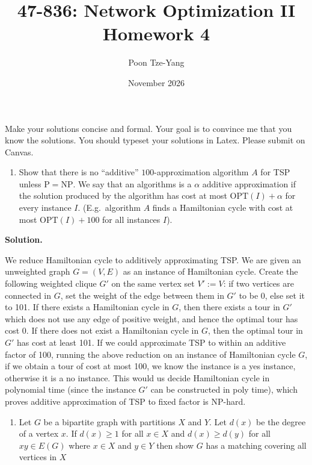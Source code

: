 \documentclass[11pt,letterpaper]{article}
\title{47-836: Network Optimization II \\ Homework 4}
\author{Poon Tze-Yang}
\date{November 2026}
\theoremstyle{definition}
\newcommand{\OPT}{\mathrm{OPT}}
\newcommand{\solution}{\medskip\noindent\textbf{Solution.}\par\medskip}
\begin{document}
\maketitle

Make your solutions concise and formal. Your goal is to convince me that you know the solutions. You should typeset your solutions in Latex. Please submit on Canvas.

\begin{enumerate}[series=q]
\item Show that there is no ``additive'' $100$-approximation algorithm $A$ for TSP unless $\mathrm{P} = \mathrm{NP}$. We say that an algorithms is a $\alpha$ additive approximation if the solution produced by the algorithm has cost at most $\OPT(I) + \alpha$ for every instance $I$. (E.g.\ algorithm $A$ finds a Hamiltonian cycle with cost at most $\OPT(I) + 100$ for all instances $I$).
\end{enumerate}

\solution
We reduce Hamiltonian cycle to additively approximating TSP.
We are given an unweighted graph $G = (V,E)$ as an instance of Hamiltonian cycle.
Create the following weighted clique $G'$ on the same vertex set $V':=V$: if two vertices are connected in $G$, set the weight of the edge between them in $G'$ to be 0, else set it to 101.
If there exists a Hamiltonian cycle in $G$, then there exists a tour in $G'$ which does not use any edge of positive weight, and hence the optimal tour has cost 0.
If there does not exist a Hamiltonian cycle in $G$, then the optimal tour in $G'$ has cost at least 101.
If we could approximate TSP to within an additive factor of 100, running the above reduction on an instance of Hamiltonian cycle $G$, if we obtain a tour of cost at most 100, we know the instance is a yes instance, otherwise it is a no instance.
This would us decide Hamiltonian cycle in polynomial time (since the instance $G'$ can be constructed in poly time), which proves additive approximation of TSP to fixed factor is NP-hard.


\begin{enumerate}[resume=q]
\item Let $G$ be a bipartite graph with partitions $X$ and $Y$. Let $d(x)$ be the degree of a vertex $x$. If $d(x) \geq 1$ for all $x \in X$ and $d(x) \geq d(y)$ for all $xy \in E(G)$ where $x \in X$ and $y \in Y$ then show $G$ has a matching covering all vertices in $X$
\end{enumerate}
\end{document}
